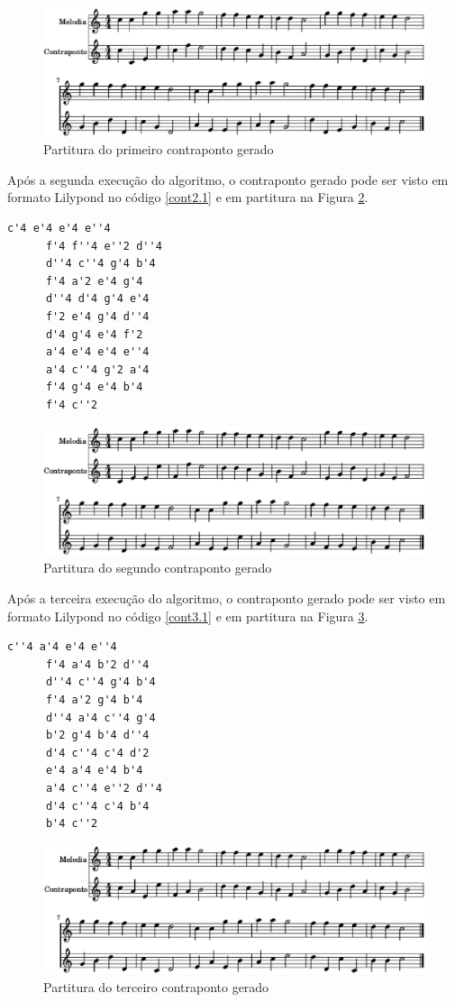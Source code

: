     \begin{figure}[htb]
      \centering
      \includegraphics[scale=0.6]{figuras/cont1.2.eps}
      \caption{Partitura do primeiro contraponto gerado}
      \label{cont1.2}
    \end{figure}

    Após a segunda execução do algoritmo, o contraponto gerado pode ser visto em formato Lilypond no código \ref{cont2.1} e em partitura na Figura \ref{cont2.2}.

    \begin{lstlisting}[caption={Segundo contraponto gerado}, label={cont2.1}]
      c'4 e'4 e'4 e''4
      f'4 f''4 e''2 d''4
      d''4 c''4 g'4 b'4
      f'4 a'2 e'4 g'4
      d''4 d'4 g'4 e'4
      f'2 e'4 g'4 d''4
      d'4 g'4 e'4 f'2
      a'4 e'4 e'4 e''4
      a'4 c''4 g'2 a'4
      f'4 g'4 e'4 b'4
      f'4 c''2
    \end{lstlisting}

    \begin{figure}[htb]
      \centering
      \includegraphics[scale=0.6]{figuras/cont2.2.eps}
      \caption{Partitura do segundo contraponto gerado}
      \label{cont2.2}
    \end{figure}

    Após a terceira execução do algoritmo, o contraponto gerado pode ser visto em formato Lilypond no código \ref{cont3.1} e em partitura na Figura \ref{cont3.2}.

    \begin{lstlisting}[caption={Terceiro contraponto gerado}, label={cont3.1}]
      c''4 a'4 e'4 e''4
      f'4 a'4 b'2 d''4
      d''4 c''4 g'4 b'4
      f'4 a'2 g'4 b'4
      d''4 a'4 c''4 g'4
      b'2 g'4 b'4 d''4
      d'4 c''4 c'4 d'2
      e'4 a'4 e'4 b'4
      a'4 c''4 e''2 d''4
      d'4 c''4 c'4 b'4
      b'4 c''2
    \end{lstlisting}

    \begin{figure}[htb]
      \centering
      \includegraphics[scale=0.6]{figuras/cont3.2.eps}
      \caption{Partitura do terceiro contraponto gerado}
      \label{cont3.2}
    \end{figure}
